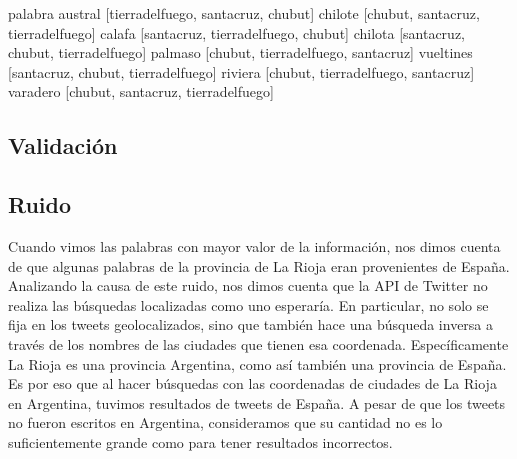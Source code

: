 palabra
austral      [tierradelfuego, santacruz, chubut]
chilote      [chubut, santacruz, tierradelfuego]
calafa       [santacruz, tierradelfuego, chubut]
chilota      [santacruz, chubut, tierradelfuego]
palmaso      [chubut, tierradelfuego, santacruz]
vueltines    [santacruz, chubut, tierradelfuego]
riviera      [chubut, tierradelfuego, santacruz]
varadero     [chubut, santacruz, tierradelfuego]

\subsection{Validación}

\subsection{Ruido} %
\label{ssub:ruido}


Cuando vimos las palabras con mayor valor de la información, nos dimos cuenta de que algunas palabras de la provincia de La Rioja eran provenientes de España. Analizando la causa de este ruido, nos dimos cuenta que la API de Twitter no realiza las búsquedas localizadas como uno esperaría. En particular, no solo se fija en los tweets geolocalizados, sino que también hace una búsqueda inversa a través de los nombres de las ciudades que tienen esa coordenada. Específicamente La Rioja es una provincia Argentina, como así también una provincia de España. Es por eso que al hacer búsquedas con las coordenadas de ciudades de La Rioja en Argentina, tuvimos resultados de tweets de España. A pesar de que los tweets no fueron escritos en Argentina, consideramos que su cantidad no es lo suficientemente grande como para tener resultados incorrectos.


